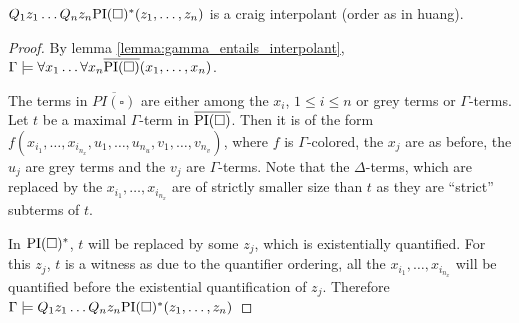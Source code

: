 \begin{thm}
	$Q_1 z_1 \ldots Q_n z_n \mathrm{PI}(\square)^*(z_1, \ldots, z_n)$ is a craig interpolant (order as in huang).
\end{thm}
\begin{proof}
	By lemma \ref{lemma:gamma_entails_interpolant}, $\Gamma \models \forall x_1 \ldots \forall x_n \overline{\mathrm{PI}(\square)}(x_1, \ldots, x_n)$.

	The terms in $\overline{PI(\square)}$ are either among the $x_i$, $1 \leq i \leq n$ or grey terms or $\Gamma$-terms.
	Let $t$ be a maximal $\Gamma$-term in $\overline{\mathrm{PI}(\square)}$.
	Then it is of the form $f(x_{i_1}, \ldots, x_{i_{n_x}}, u_1, \ldots, u_{n_u}, v_1, \ldots, v_{n_v})$, where $f$ is $\Gamma$-colored, the $x_j$ are as before, the $u_j$ are grey terms and the $v_j$ are $\Gamma$-terms.
	Note that the $\Delta$-terms, which are replaced by the $x_{i_1}, \ldots, x_{i_{n_x}}$ are of strictly smaller size than $t$ as they are ``strict'' subterms of $t$.

	In $\mathrm{PI}(\square)^*$, $t$ will be replaced by some $z_j$, which is existentially quantified.
	For this $z_j$, $t$ is a witness as due to the quantifier ordering, all the $x_{i_1}, \ldots, x_{i_{n_x}}$ will be quantified before the existential quantification of $z_j$.
	Therefore $\Gamma \models Q_1 z_1 \ldots Q_n z_n \mathrm{PI}(\square)^*(z_1, \ldots, z_n)$

\end{proof}



